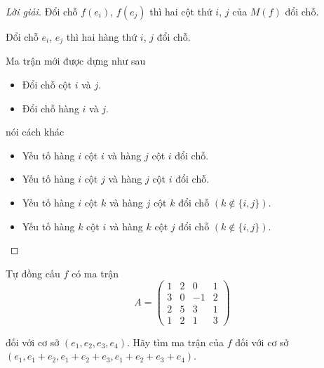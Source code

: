 \begin{proof}[Lời giải]
    Đổi chỗ $f(e_{i})$, $f(e_{j})$ thì hai cột thứ $i$, $j$ của $M(f)$ đổi chỗ.
    
    Đổi chỗ $e_{i}$, $e_{j}$ thì hai hàng thứ $i$, $j$ đổi chỗ.
    
    Ma trận mới được dựng như sau
    \begin{itemize}
        \item Đổi chỗ cột $i$ và $j$.
        \item Đổi chỗ hàng $i$ và $j$.
    \end{itemize}
    
    nói cách khác
    \begin{itemize}
        \item Yếu tố hàng $i$ cột $i$ và hàng $j$ cột $i$ đổi chỗ.
        \item Yếu tố hàng $i$ cột $j$ và hàng $j$ cột $i$ đổi chỗ.
        \item Yếu tố hàng $i$ cột $k$ và hàng $j$ cột $k$ đổi chỗ $(k\not\in\{ i, j \})$.
        \item Yếu tố hàng $k$ cột $i$ và hàng $k$ cột $j$ đổi chỗ $(k\not\in\{ i, j \})$.
    \end{itemize}
\end{proof}

\begin{exercise}
    Tự đồng cấu $f$ có ma trận
    \[
        A =
        \begin{pmatrix}
            1 & 2 & 0  & 1 \\
            3 & 0 & -1 & 2 \\
            2 & 5 & 3  & 1 \\
            1 & 2 & 1  & 3
        \end{pmatrix}
    \]
    
    đối với cơ sở $(e_{1}, e_{2}, e_{3}, e_{4})$. Hãy tìm ma trận của $f$ đối với cơ sở $(e_{1}, e_{1} + e_{2}, e_{1} + e_{2} + e_{3}, e_{1} + e_{2} + e_{3} + e_{4})$.
\end{exercise}

